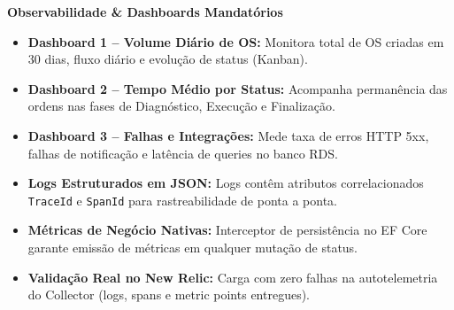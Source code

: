 \documentclass[9pt,a4paper]{article}
\begin{document}
\begin{minipage}[t]{0.49\textwidth}
    \begin{tcolorbox}[subtlebox]
        \textbf{\color{accentblue} Observabilidade \& Dashboards Mandatórios}\par\vspace{0.08cm}
        \begin{itemize}\setlength{\itemsep}{1.5pt}\setlength{\parskip}{0pt}\scriptsize
            \item \textbf{Dashboard 1 -- Volume Diário de OS:} Monitora total de OS criadas em 30 dias, fluxo diário e evolução de status (Kanban).
            \item \textbf{Dashboard 2 -- Tempo Médio por Status:} Acompanha permanência das ordens nas fases de Diagnóstico, Execução e Finalização.
            \item \textbf{Dashboard 3 -- Falhas e Integrações:} Mede taxa de erros HTTP 5xx, falhas de notificação e latência de queries no banco RDS.
            \item \textbf{Logs Estruturados em JSON:} Logs contêm atributos correlacionados \texttt{TraceId} e \texttt{SpanId} para rastreabilidade de ponta a ponta.
            \item \textbf{Métricas de Negócio Nativas:} Interceptor de persistência no EF Core garante emissão de métricas em qualquer mutação de status.
            \item \textbf{Validação Real no New Relic:} Carga com zero falhas na autotelemetria do Collector (logs, spans e metric points entregues).
        \end{itemize}
    \end{tcolorbox}
\end{minipage}

\vspace{0.15cm}
\end{document}
